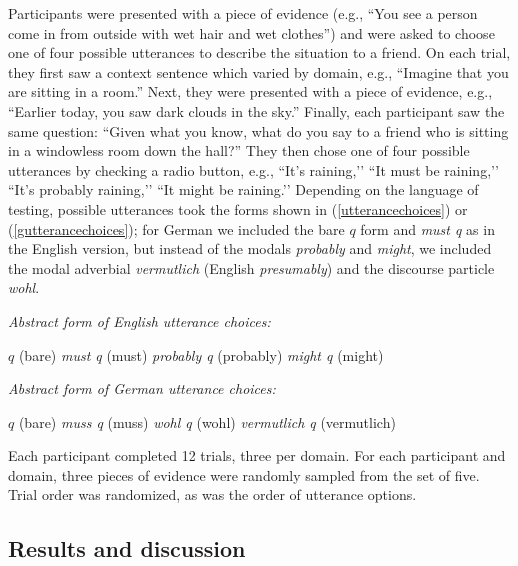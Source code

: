 \documentclass[11pt]{article}
\newcommand{\eref}[1]{(\ref{#1})}
\begin{document}
Participants were presented with a piece of evidence (e.g., ``You see a person come in from outside with wet hair and wet clothes'') and were asked to choose one of four possible utterances to describe the situation to a friend. On each trial, they first saw a context sentence which varied by domain, e.g., ``Imagine that you are sitting in a room.'' Next, they were presented with a piece of evidence, e.g., ``Earlier today, you saw dark clouds in the sky.'' Finally, each participant saw the same question: ``Given what you know, what do you say to a friend who is sitting in a windowless room down the hall?'' They then chose one of four possible utterances by checking a radio button, e.g., ``It's raining,’’ ``It must be raining,’’ ``It's probably raining,’’ ``It might be raining.’’ Depending on the language of testing, possible utterances took the forms shown in \eref{utterancechoices} or \eref{gutterancechoices}; for German we included the bare $q$ form and \emph{must q} as in the English version, but instead of the modals \emph{probably} and \emph{might}, we included the modal adverbial \emph{vermutlich} (English \emph{presumably}) and the discourse particle \emph{wohl}.


\begin{exe}
	\ex\label{utterancechoices} \emph{Abstract form of English utterance choices:}
	\begin{xlist}
		\ex $q$ (bare)
		\ex \emph{must q} (must)
		\ex \emph{probably q} (probably)
		\ex \emph{might q} (might)
		\end{xlist}
	\ex\label{gutterancechoices} \emph{Abstract form of German utterance choices:}
	\begin{xlist}
		\ex $q$ (bare)
		\ex \emph{muss q} (muss)
		\ex \emph{wohl q} (wohl)
		\ex \emph{vermutlich q} (vermutlich)
		\end{xlist}
		\end{exe}
		
Each participant completed 12 trials, three per domain. For each participant and domain, three pieces of evidence were randomly sampled from the set of five. Trial order was randomized, as was the order of utterance options.


\subsection{Results and discussion}
\end{document}
